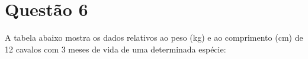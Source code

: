 \documentclass[a4paper,11pt,twoside,openright]{report}
\begin{document}
% 
% 

\section*{Quest\~{a}o 6}
\hspace{0.5cm}A tabela abaixo mostra os dados relativos ao peso (kg) e ao comprimento (cm) de 12 cavalos com 3 meses de vida de uma determinada esp\'{e}cie:
\end{document}
